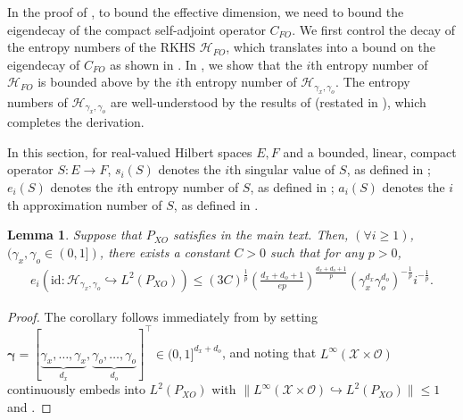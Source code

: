 \documentclass[11pt]{article}
\newcommand{\bgamma}{\boldsymbol{\gamma}}
\newcommand{\calH}{\mathcal{H}}
\newcommand{\calO}{\mathcal{O}}
\newcommand{\calX}{\mathcal{X}}
\newcommand{\0}{\mathbf{0}}
\newtheorem{lem}{Lemma}[section]
\begin{document}
\begin{appendix}
In the proof of , to bound the effective dimension, we need to bound the eigendecay of the compact self-adjoint operator $C_{FO}$. We first control the decay of the entropy numbers of the RKHS $\calH_{FO}$, which translates into a bound on the eigendecay of $C_{FO}$ as shown in . In , we show that the $i$th entropy number of $\calH_{FO}$ is bounded above by the $i$th entropy number of $\calH_{\gamma_x,\gamma_o}$. The entropy numbers of $\calH_{\gamma_x,\gamma_o}$ are well-understood by the results of \citet{hang2021optimal} (restated in ), which completes the derivation. 

In this section, for real-valued Hilbert spaces $E,F$ and a bounded, linear, compact operator $S:E\to F$, $s_i(S)$ denotes the $i$th singular value of $S$, as defined in \citet[Eq. (A.25) Page 505]{steinwart2008support}; $e_i(S)$ denotes the $i$th entropy number of $S$, as defined in \citet[Definition A.5.26 Page 516]{steinwart2008support}; $a_i(S)$ denotes the $i$th approximation number of $S$, as defined in \citet[Eq. (A.29) Page 506]{steinwart2008support}. 

\begin{lem}
    \label{cor:entropy_bounded_obscov}
    Suppose that $P_{XO}$ satisfies  in the main text. Then, $(\forall i\geq 1)$, $(\gamma_x,\gamma_o\in (0,1])$, there exists a constant $C>0$ such that for any $p>0$,
    \begin{align*}
        e_i(\mathrm{id} : \calH_{\gamma_x,\gamma_o}\hookrightarrow L^{2}(P_{XO})) \leq (3C)^{\frac{1}{p}} \left(\frac{d_x+d_o+1}{ep}\right)^{\frac{d_x+d_o+1}{p}}\left(\gamma_x^{d_x}\gamma_o^{d_o}\right)^{-\frac{1}{p}}i^{-\frac{1}{p}}.
    \end{align*}
\end{lem}
\begin{proof}
    The corollary follows immediately from \citet[Proposition 1]{hang2021optimal} by setting $\bgamma=[\underbrace{\gamma_x, \ldots, \gamma_x}_{d_x}, \underbrace{\gamma_o, \ldots, \gamma_o}_{d_o}]^\top \in (0,1]^{d_x+d_o}$, and noting that $L^{\infty}(\calX\times \calO)$ continuously embeds into $L^2(P_{XO})$ with $\|L^{\infty}(\calX\times \calO)\hookrightarrow L^2(P_{XO})\|\leq 1$ and \citet[Eq. (A.38)]{steinwart2008support}. 
\end{proof}



\end{appendix}
\end{document}

